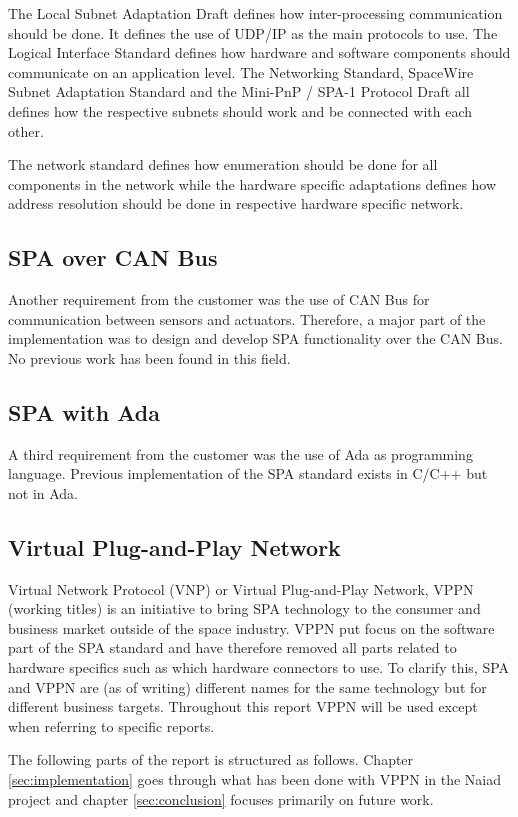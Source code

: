 The Local Subnet Adaptation Draft defines how inter-processing communication
should be done. It defines the use of UDP/IP as the main protocols to use. The
Logical Interface Standard defines how hardware and software components should
communicate on an application level. The Networking Standard, SpaceWire Subnet
Adaptation Standard and the Mini-PnP / SPA-1 Protocol Draft all defines how the
respective subnets should work and be connected with each other.

The network
standard defines how enumeration should be done for all components in
the network while the hardware specific adaptations defines how address
resolution should be done in respective hardware specific network.

\subsection{SPA over CAN Bus}
Another requirement from the customer was the use of CAN Bus
\cite{standard:can_bus} for communication between sensors and actuators.
Therefore, a major part of the implementation was to design and develop SPA functionality over the CAN
Bus. No previous work has been found in this field.

\subsection{SPA with Ada}
A third requirement from the customer was the use of Ada as programming
language. Previous implementation of the SPA standard exists in C/C++ but not
in Ada.

\subsection{Virtual Plug-and-Play Network}
Virtual Network Protocol (VNP) \cite{web:vnp} or Virtual Plug-and-Play
Network, VPPN (working titles) is an initiative to bring SPA technology to
the consumer and business market outside of the space industry. VPPN put focus
on the software part of the SPA standard and have therefore removed all parts
related to hardware specifics such as which hardware connectors to use. To
clarify this, SPA and VPPN are (as of writing) different names for the same technology but for different business targets. Throughout this report VPPN will be used
except when referring to specific reports.

The following parts of the report is structured as follows. Chapter \ref{sec:implementation}
goes through what has been done with VPPN in the Naiad project and chapter
\ref{sec:conclusion} focuses primarily on future work.
